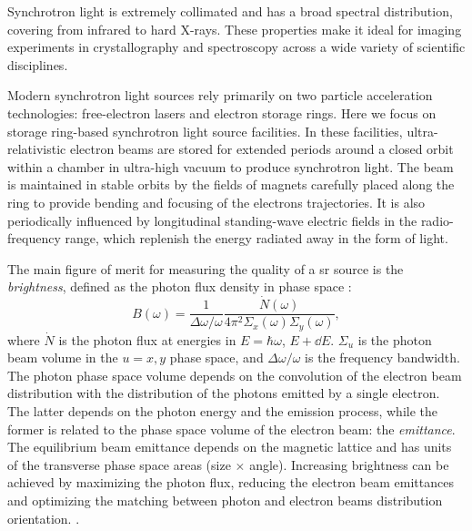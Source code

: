 Synchrotron light is extremely collimated and has a broad spectral distribution, covering from infrared to hard X-rays. These properties make it ideal for imaging experiments in crystallography and spectroscopy across a wide variety of scientific disciplines.

Modern synchrotron light sources rely primarily on two particle acceleration technologies: free-electron lasers and electron storage rings. Here we focus on storage ring-based synchrotron light source facilities. In these facilities, ultra-relativistic electron beams are stored for extended periods around a closed orbit within a chamber in ultra-high vacuum to produce synchrotron light. The beam is maintained in stable orbits by the fields of magnets carefully placed along the ring to provide bending and focusing of the electrons trajectories. It is also periodically influenced by longitudinal standing-wave electric fields in the radio-frequency range, which replenish the energy radiated away in the form of light.

The main figure of merit for measuring the quality of a \gls*{sr} source is the \textit{brightness}\cite{huang_brightness_2013}, defined as the photon flux density in phase space \cite{hettel_challenges_2014,wiedemann_particle_2015}:
\begin{equation}
    B(\omega) = \frac{1}{\Delta \omega/\omega}\frac{\dot{N}(\omega)}{4\pi^2\Sigma_{x}(\omega)\Sigma_{y}(\omega)},
\end{equation}
where $\dot{N}$ is the photon flux at energies in $E=\hbar\omega$, $E+\dd{E}$. $\Sigma_{u}$ is the photon beam volume in the $u=x,y$ phase space, and $\Delta\omega/\omega$ is the frequency bandwidth. The photon phase space volume depends on the convolution of the electron beam distribution with the distribution of the photons emitted by a single electron. The latter depends on the photon energy and the emission process, while the former is related to the phase space volume of the electron beam: the \textit{emittance}. The equilibrium beam emittance depends on the magnetic lattice and has units of the transverse phase space areas (size $\times$ angle). Increasing brightness can be achieved by maximizing the photon flux, reducing the electron beam emittances and optimizing the matching between photon and electron beams distribution orientation. \cite{wiedemann_particle_2015}.

